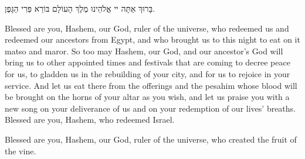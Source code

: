 בָּרוּךְ אַתָּה יי אֱלֹהֵינוּ מֶלֶךְ הָעוֹלָם בּוֹרֵא פְּרִי הַגָּפֶן.

\begin{english}
Blessed are you, Hashem, our God, ruler of the universe, who redeemed us and redeemed our ancestors from Egypt, and who brought us to this night to eat on it matso and maror. So too may Hashem, our God, and our ancestor's God will bring us to other appointed times and festivals that are coming to decree peace for us, to gladden us in the rebuilding of your city, and for us to rejoice in your service. And let us eat there from the offerings and the pesahim whose blood will be brought on the horns of your altar as you wish, and let us praise you with a new song on your deliverance of us and on your redemption of our lives' breaths. Blessed are you, Hashem, who redeemed Israel.

Blessed are you, Hashem, our God, ruler of the universe, who created the fruit of the vine.
\end{english}

\begin{center}
\end{center} 